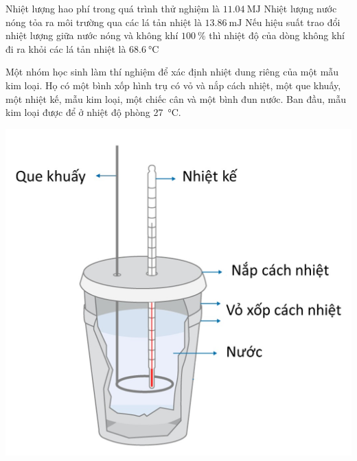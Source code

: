 \begin{ex}
	{Nhiệt lượng hao phí trong quá trình thử nghiệm là $\SI{11.04}{\mega\joule}$}
	{\True Nhiệt lượng nước nóng tỏa ra môi trường qua các lá tản nhiệt là $\SI{13.86}{\meter\joule}$}
	{\True Nếu hiệu suất trao đổi nhiệt lượng giữa nước nóng và không khí $\SI{100}{\percent}$ thì nhiệt độ của dòng không khí đi ra khỏi các lá tản nhiệt là $\SI{68.6}{\celsius}$}
	\loigiai{}
\end{ex}
\begin{ex}
	Một nhóm học sinh làm thí nghiệm để xác định nhiệt dung riêng của một mẫu kim loại. Họ có một bình xốp hình trụ có vỏ và nắp cách nhiệt, một que khuấy, một nhiệt kế, mẫu kim loại, một chiếc cân và một bình đun nước. Ban đầu, mẫu kim loại được để ở nhiệt độ phòng \SI{27}{\celsius}.
	\begin{center}
		\includegraphics[scale=0.35]{figs/G12Y24B4-2}
	\end{center}

\end{ex}

